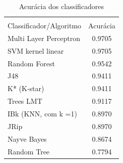 \begin{table}[h!]
	\centering
	\caption{Acurácia dos classificadores}
	\label{tab:acuracias}
	\vspace{0.3cm}
	\begin{tabular}{p{6cm}c}
		\hline\\
		Classificador/Algoritmo& Acurácia  \\[10pt] 
		\hline
		Multi Layer Perceptron & 0.9705    \\
		SVM kernel linear~     & 0.9705    \\
		Random Forest~		   & 0.9542	   \\
		J48                    & 0.9411    \\
		K* (K-star)            & 0.9411    \\
		Trees LMT              & 0.9117    \\
		IBk (KNN, com k =1)~   & 0.8970    \\
		JRip                   & 0.8970    \\		
		Nayve Bayes            & 0.8674    \\
		Random Tree            & 0.7794    \\
		\hline
	\end{tabular}
	\\[6pt]		
\end{table}

